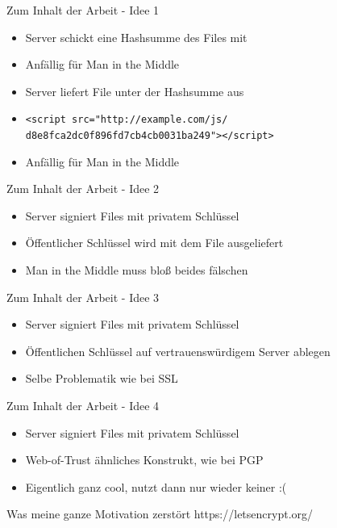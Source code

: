 \documentclass{beamer}
\begin{document}
\begin{frame}{Zum Inhalt der Arbeit - Idee 1}
  \begin{itemize}
    \item Server schickt eine Hashsumme des Files mit
    \item Anfällig für Man in the Middle
  \end{itemize}
  \begin{itemize}
    \item Server liefert File unter der Hashsumme aus
    \item \texttt{<script src="{}http://example.com/js/ d8e8fca2dc0f896fd7cb4cb0031ba249"{}></script>}
    \item Anfällig für Man in the Middle
  \end{itemize}
\end{frame}

\begin{frame}{Zum Inhalt der Arbeit - Idee 2}
  \begin{itemize}
    \item Server signiert Files mit privatem Schlüssel
    \item Öffentlicher Schlüssel wird mit dem File ausgeliefert
    \item Man in the Middle muss bloß beides fälschen
  \end{itemize}
\end{frame}

\begin{frame}{Zum Inhalt der Arbeit - Idee 3}
  \begin{itemize}
    \item Server signiert Files mit privatem Schlüssel
    \item Öffentlichen Schlüssel auf vertrauenswürdigem Server ablegen
    \item Selbe Problematik wie bei SSL
  \end{itemize}
\end{frame}

\begin{frame}{Zum Inhalt der Arbeit - Idee 4}
  \begin{itemize}
    \item Server signiert Files mit privatem Schlüssel
    \item Web-of-Trust ähnliches Konstrukt, wie bei PGP
    \item Eigentlich ganz cool, nutzt dann nur wieder keiner :(
  \end{itemize}
\end{frame}

\begin{frame}{Was meine ganze Motivation zerstört}
  https://letsencrypt.org/
\end{frame}
\end{document}
